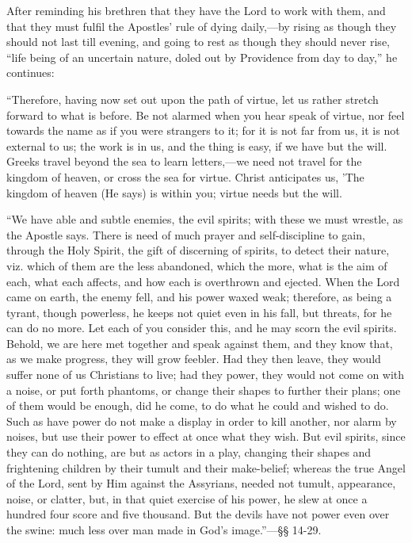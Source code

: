 After reminding his brethren that they have the Lord to work with
them, and that they must fulfil the Apostles' rule of dying daily,—by
rising as though they should not last till evening, and going to rest
as though they should never rise, ``life being of an uncertain
nature, doled out by Providence from day to day,'' he continues:

``Therefore, having now set out upon the path of virtue, let us
rather stretch forward to what is before. Be not alarmed when you hear
speak of virtue, nor feel towards the name as if you were strangers to
it; for it is not far from us, it is not external to us; the work is
in us, and the thing is easy, if we have but the will. Greeks travel
beyond the sea to learn letters,—we need not travel for the kingdom
of heaven, or cross the sea for virtue. Christ anticipates us, 'The
kingdom of heaven (He says) is within you; virtue needs but the will.

``We have able and subtle enemies, the evil spirits; with these
we must wrestle, as the Apostle says. There is need of much prayer and
self-discipline to gain, through the Holy Spirit, the gift of
discerning of spirits, to detect their nature, viz. which of them are
the less abandoned, which the more, what is the aim of each, what each
affects, and how each is overthrown and ejected. When the Lord came on
earth, the enemy fell, and his power waxed weak; therefore, as being a
tyrant, though powerless, he keeps not quiet even in his fall, but
threats, for he can do no more. Let each of you consider this, and he
may scorn the evil spirits. Behold, we are here met together and speak
against them, and they know that, as we make progress, they will grow
feebler. Had they then leave, they would suffer none of us Christians
to live; had they power, they would not come on with a noise, or put
forth phantoms, or change their shapes to further their plans; one of
them would be enough, did he come, to do what he could and wished to
do. Such as have power do not make a display in order to kill another,
nor alarm by noises, but use their power to effect at once what they
wish. But evil spirits, since they can do nothing, are but as actors
in a play, changing their shapes and frightening children by their
tumult and their make-belief; whereas the true Angel of the Lord, sent
by Him against the Assyrians, needed not tumult, appearance, noise, or
clatter, but, in that quiet exercise of his power, he slew at once a
hundred four score and five thousand. But the devils have not power
even over the swine: much less over man made in God's image.''—§§
14-29.

